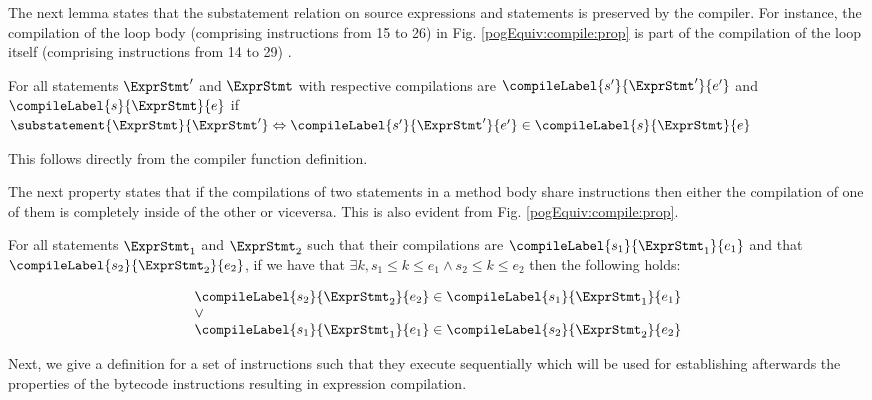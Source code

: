  
The next lemma  states that the substatement relation on source expressions and statements is preserved
by the compiler. For instance, the compilation of the loop body (comprising instructions from 15 to 26) in Fig. \ref{pogEquiv:compile:prop}  
is part of the compilation of the loop itself (comprising instructions from 14 to 29) .

\begin{compProp11}\label{compile:prop:compPropSubstmt}
For all statements $\ExprStmt'$ and $\ExprStmt $ with
respective compilations are $\compileLabel{s'}{\ExprStmt'}{e'}$ and  $\compileLabel{s}{\ExprStmt}{e}$ 
if 
  $  \substatement{\ExprStmt }{\ExprStmt'} \Leftrightarrow \compileLabel{s'}{\ExprStmt'}{e'} \in  \compileLabel{s}{\ExprStmt}{e} $ 
\end{compProp11}
This follows directly from the compiler function definition.

The next property states that if the compilations of two
statements in a method body share instructions then 
either the compilation of one of them is completely inside of the other or viceversa.
This is also evident from Fig. \ref{pogEquiv:compile:prop}.

\begin{compProp6}\label{compile:prop:compProp6}
For all statements $\ExprStmt_1$ and $\ExprStmt_2$ such that their compilations are 
 $\compileLabel{s_1}{\ExprStmt_1}{e_1} $ and that   $\compileLabel{s_2}{\ExprStmt_2}{e_2} $, if we have that 
$ \exists k,  s_1 \le k  \le e_1 \wedge s_2 \le k  \le e_2  $ then the following holds:

$$\begin{array}{l}
         \compileLabel{s_2}{\ExprStmt_2}{e_2}  \in \compileLabel{s_1}{\ExprStmt_1}{e_1}\\   
	 \vee \\
	 \compileLabel{s_1}{\ExprStmt_1}{e_1}  \in \compileLabel{s_2}{\ExprStmt_2}{e_2} 
\end{array}$$
\end{compProp6}

Next, we give a definition for a set of instructions such that they execute sequentially which will be used for 
establishing afterwards the properties of the bytecode instructions resulting in expression compilation.
 
